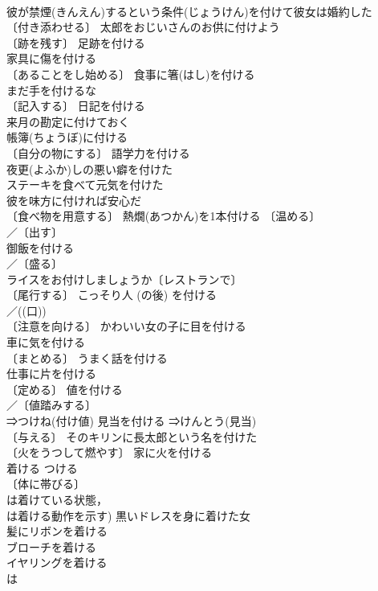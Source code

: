 \documentclass[8pt]{extreport}
\begin{document}
\begin{CJK}{UTF8}{min}
\\	彼が禁煙(きんえん)するという条件(じょうけん)を付けて彼女は婚約した 
\\	〔付き添わせる〕 太郎をおじいさんのお供に付けよう 
\\	〔跡を残す〕 足跡を付ける 
\\	家具に傷を付ける 
\\	〔あることをし始める〕 食事に箸(はし)を付ける 
\\	まだ手を付けるな 
\\	〔記入する〕 日記を付ける 
\\	来月の勘定に付けておく 
\\	帳簿(ちょうぼ)に付ける 
\\	〔自分の物にする〕 語学力を付ける 
\\	夜更(よふか)しの悪い癖を付けた 
\\	ステーキを食べて元気を付けた 
\\	彼を味方に付ければ安心だ 
\\	〔食べ物を用意する〕 熱燗(あつかん)を1本付ける 〔温める〕
\\	／〔出す〕
\\	御飯を付ける 
\\	／〔盛る〕
\\	ライスをお付けしましょうか〔レストランで〕 
\\	〔尾行する〕 こっそり人 (の後) を付ける 
\\	／((口))
\\	〔注意を向ける〕 かわいい女の子に目を付ける 
\\	車に気を付ける 
\\	〔まとめる〕 うまく話を付ける 
\\	仕事に片を付ける 
\\	〔定める〕 値を付ける 
\\	／〔値踏みする〕
\\	⇒つけね(付け値) 見当を付ける ⇒けんとう(見当) 
\\	〔与える〕 そのキリンに長太郎という名を付けた 
\\	〔火をうつして燃やす〕 家に火を付ける 
\\	着ける	つける	
\\	〔体に帯びる〕
\\	は着けている状態，
\\	は着ける動作を示す) 黒いドレスを身に着けた女 
\\	髪にリボンを着ける 
\\	ブローチを着ける 
\\	イヤリングを着ける 
\\	は

\end{CJK}
\end{document}
